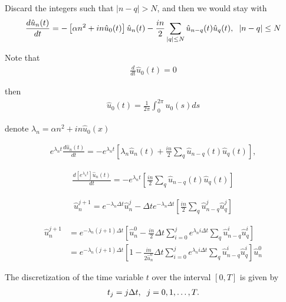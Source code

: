 		Discard the integers such that $| n - q | > N$, and then we would stay with
		\begin{align*}
			\frac{d \hat{u}_n (t)}{dt} = - \left[\alpha n^2 + in \hat{u}_0 (t) \right] \hat{u}_n (t) - \frac{in}{2}  \sum_{|q| \leq N} \hat{u}_{n - q} (t) \hat{u}_q (t), \hspace{2mm} |n - q| \leq N  
		\end{align*}
		
		Note that
		\begin{align*}
			\frac{d}{dt} \hat{u}_0 (t) = 0 
		\end{align*}
		
		then
		\begin{align*}
			\hat{u}_0 (t) = \frac{1}{2 \pi} \displaystyle \int_{0}^{2 \pi} u_0 (s) ds 
		\end{align*}
		
		denote $\lambda_n = \alpha n^2 + in \hat{u}_0 (x)$
		
		\begin{align*}
			e^{ \lambda_n t} \frac{d \hat{u}_n (t)}{dt} = - e^{\lambda_n t} [ \lambda_n \hat{u}_n (t) + \frac{in}{2}  \sum_{q} \hat{u}_{n - q} (t) \hat{u}_q (t)],
		\end{align*}
		
		\begin{align*}
			\frac{d \left[ e^{\lambda_n t} \right]  \hat{u}_n (t)}{dt} = - e^{ \lambda_n t} [ \frac{in}{2}  \sum_{q} \hat{u}_{n - q} (t) \hat{u}_q (t)]
		\end{align*}
			
		\begin{align*}
			\hat{u}_n^{j+1} = e^{-\lambda_n \Delta t} \hat{u}_n^{j} - \Delta t e^{- \lambda_n \Delta t} [ \frac{in}{2}  \sum_{q} \hat{u}_{n - q}^{j} \hat{u}_q^{j}]
		\end{align*}
			
		\begin{align*}
			\hat{u}_n^{j+1} &= e^{-\lambda_n (j+1) \Delta t} \left[ \hat{u}_n^{0} - \frac{in}{2} \Delta t  \displaystyle \sum_{i = 0}^{j} e^{ \lambda_n i \Delta t} \sum_{q} \hat{u}_{n - q}^{i} \hat{u}_q^{i} \right] \\
			&= e^{-\lambda_n (j+1) \Delta t} \left[ 1 - \frac{in}{2 \hat{u}^0_n} \Delta t  \displaystyle \sum_{i = 0}^{j} e^{ \lambda_n i \Delta t} \sum_{q} \hat{u}_{n - q}^{i} \hat{u}_q^{i} \right] \hat{u}^0_n
		\end{align*}
	
		The discretization of the time variable $t$ over the interval $[0, T]$ is given by
		\begin{align*}
			t_j = j \Delta t, \hspace{2mm} j = 0, 1, \dots, T.
		\end{align*} 
		
